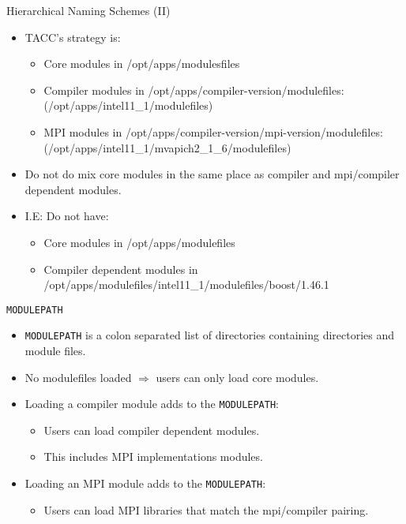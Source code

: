 \documentclass{beamer}
\begin{document}
\begin{frame}{Hierarchical Naming Schemes (II)}
  \begin{itemize}
    \item TACC's strategy is:
      \begin{itemize}
        \item Core modules in /opt/apps/modulesfiles
        \item Compiler modules in
          /opt/apps/compiler-version/modulefiles: (/opt/apps/intel11\_1/modulefiles)
        \item MPI modules in
          /opt/apps/compiler-version/mpi-version/modulefiles: (/opt/apps/intel11\_1/mvapich2\_1\_6/modulefiles)
      \end{itemize}
    \item Do not do mix core modules in the same place as compiler and
      mpi/compiler dependent modules.
    \item I.E: Do not have:
      \begin{itemize}
        \item Core modules in /opt/apps/modulefiles
        \item Compiler dependent modules in /opt/apps/modulefiles/intel11\_1/modulefiles/boost/1.46.1
      \end{itemize}
      
  \end{itemize}
\end{frame}

\begin{frame}{\texttt{MODULEPATH}}
  \begin{itemize}
    \item \texttt{MODULEPATH} is a colon separated list of directories
      containing directories and module files.
    \item No modulefiles loaded $\Rightarrow$ users can only load core modules.
    \item Loading a compiler module adds to the \texttt{MODULEPATH}:
      \begin{itemize}
        \item Users can load compiler dependent modules.
        \item This includes MPI implementations modules.
      \end{itemize}
    \item Loading an MPI module adds to the \texttt{MODULEPATH}:
      \begin{itemize}
        \item Users can load MPI libraries that match the mpi/compiler pairing.
      \end{itemize}
  \end{itemize}
\end{frame}
\end{document}

